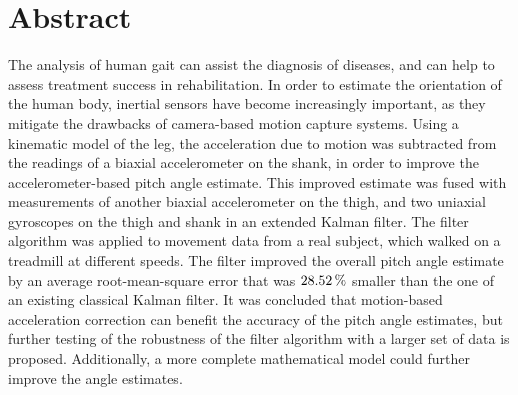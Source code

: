 \chapter{Abstract}

The analysis of human gait can assist the diagnosis of diseases, and can help to assess treatment success in rehabilitation. In order to estimate the orientation of the human body, inertial sensors have become increasingly important, as they mitigate the drawbacks of camera-based motion capture systems. Using a kinematic model of the leg, the acceleration due to motion was subtracted from the readings of a biaxial accelerometer on the shank, in order to improve the accelerometer-based pitch angle estimate. This improved estimate was fused with measurements of another biaxial accelerometer on the thigh, and two uniaxial gyroscopes on the thigh and shank in an extended Kalman filter. The filter algorithm was applied to movement data from a real subject, which walked on a treadmill at different speeds. The filter improved the overall pitch angle estimate by an average root-mean-square error that was $\unit[28.52]{\%}$ smaller than the one of an existing classical Kalman filter. It was concluded that motion-based acceleration correction can benefit the accuracy of the pitch angle estimates, but further testing of the robustness of the filter algorithm with a larger set of data is proposed. Additionally, a more complete mathematical model could further improve the angle estimates.
